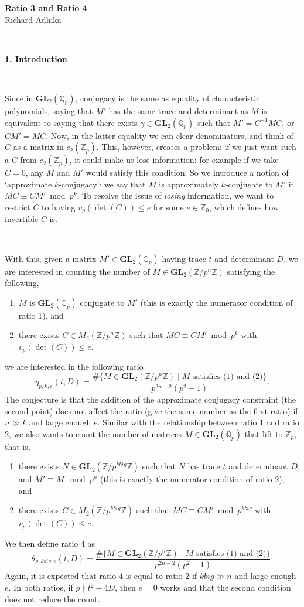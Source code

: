 \documentclass[letterpaper,12pt]{article}
\newcommand{\Z}{\mathbb{Z}}
\newcommand{\Q}{\mathbb{Q}}
\newcommand{\GL}{\mathbf {GL}}
\begin{document}
\begin{center}
    {\bf \Huge Ratio 3 and Ratio 4} \\
    Richard Adhika
\end{center}

\

{\bf \LARGE 1. Introduction}

\

Since in $\GL_2(\Q_p)$, conjugacy is the same as equality of characteristic polynomials, saying that $M'$ has the same trace and determinant as $M$ is equivalent to saying that there exists $\gamma\in \GL_2(\Q_p)$ such that 
$M'=C^{-1}MC$, or $C M'=MC$.  
Now, in the latter equality we can clear denominators, and think of $C$ as a matrix in $c_2(\Z_p)$. This, however, creates a problem: 
if we just want such a $C$ from $c_2(\Z_p)$, it could make us lose information: for example if we take $C=0$, any $M$ and $M'$ would satisfy this condition. 
So we introduce a notion of `approximate $k$-conjugacy': 
we say that $M$ is approximately $k$-conjugate to $M'$ if 
$MC  \equiv C M'\bmod p^k$.
To resolve the issue of \emph{losing} information, we want to restrict $C$ to having 
$v_p(\det(C)) \leq e$ for some $e \in \Z_0$, which defines how invertible $C$ is.

\

With this, given a matrix $M' \in \GL_2(\Q_p)$ having trace $t$ and determinant $D$,
we are interested in counting the number of $M \in \GL_2(\Z / p^n\Z)$ satisfying the following,
\begin{enumerate}
\item $M$ is $\GL_2(\Q_p)$ conjugate to $M'$ (this is exactly the numerator condition of ratio 1), and
\item there exists $C \in M_2(\Z/p^n\Z)$ such that $MC \equiv C M' \bmod p^k$ with $v_p(\det(C)) \leq e$.
\end{enumerate} 
we are interested in the following ratio
\[
\eta_{p, k, e}(t, D) = 
\frac{\#\{M \in \GL_2(\Z / p^n\Z) \; | \; M \text{ satisfies (1) and (2)} \}}{p^{2n-2}(p^2-1)}.
\]
The conjecture is that the addition of the approximate conjugacy constraint (the second point) does not affect
the ratio (give the same number as the first ratio) if $n \gg k$ and large enough $e$.
Similar with the relationship between ratio 1 and ratio 2,
we also wants to count the number of matrices $M \in \GL_2(\Q_p) $ that lift to $\Z_p$, that is, 
\begin{enumerate}
\item there exists $N \in \GL_2(\Z/p^{kbig}\Z)$ such that $N$ has trace $t$ and determinant $D$, and $M' \equiv M \mod p^n$  (this is exactly the numerator condition of ratio 2), and
\item there exists $C \in M_2(\Z/p^{kbig}\Z)$ such that $MC \equiv C M' \bmod p^{kbig}$ with $v_p(\det(C)) \leq e$.
\end{enumerate} 
We then define ratio 4 as 
\[
\theta_{p, kbig, e}(t, D) = 
\frac{\#\{M \in \GL_2(\Z / p^n\Z) \; | \; M \text{ satisfies (1) and (2)} \}}{p^{2n-2}(p^2-1)}.
\]
Again, it is expected that ratio 4 is equal to ratio 2 if $kbig \gg n$ and large enough $e$.
In both ratios, if $p \nmid t^2-4D$, then $e=0$ works and that 
the second condition does not reduce the count.
\end{document}
